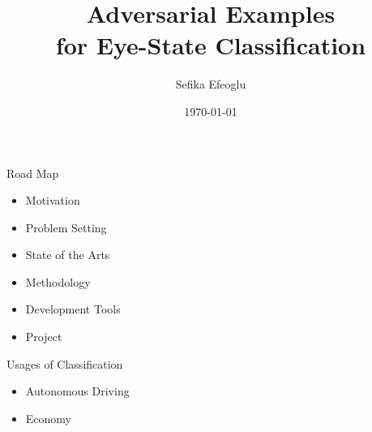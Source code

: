 \documentclass{beamer}		%
\date{\today}	%
\title[Adversarial Examples]{Adversarial Examples\\for Eye-State Classification}	%
\author[Sefika]{Sefika Efeoglu} %
\institute{University of Potsdam} %
\begin{document}


\begin{frame}	

\titlepage	%
	
\end{frame}		


\begin{frame}{Road Map}	
\begin{itemize}
\item Motivation
\item Problem Setting
\item State of the Arts
\item Methodology
\item Development Tools
\item Project
\end{itemize}
\end{frame}	

\begin{frame}{Usages of Classification}	
\begin{itemize}
\item Autonomous Driving
\item Economy
\end{itemize}
\end{frame}	
\end{document}
